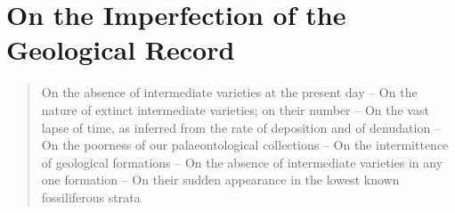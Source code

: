 \chapter{On the Imperfection of the Geological Record}

\begin{quotation}
On the absence of intermediate varieties at the present day -- On the nature of extinct intermediate varieties; on their number -- On the vast lapse of time, as inferred from the rate of deposition and of denudation -- On the poorness of our palaeontological collections -- On the intermittence of geological formations -- On the absence of intermediate varieties in any one formation -- On their sudden appearance in the lowest known fossiliferous strata
\end{quotation}


